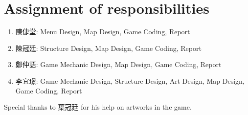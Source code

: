 \section{Assignment of responsibilities}
\begin{enumerate}
	\item 陳倢堂: Menu Design, Map Design, Game Coding, Report
    \item 陳冠廷: Structure Design, Map Design, Game Coding, Report
    \item 鄭仲語: Game Mechanic Design, Map Design, Game Coding, Report
    \item 李宜璟: Game Mechanic Design, Structure Design, Art Design, Map Design, Game Coding, Report
\end{enumerate}

Special thanks to 葉冠廷 for his help on artworks in the game.